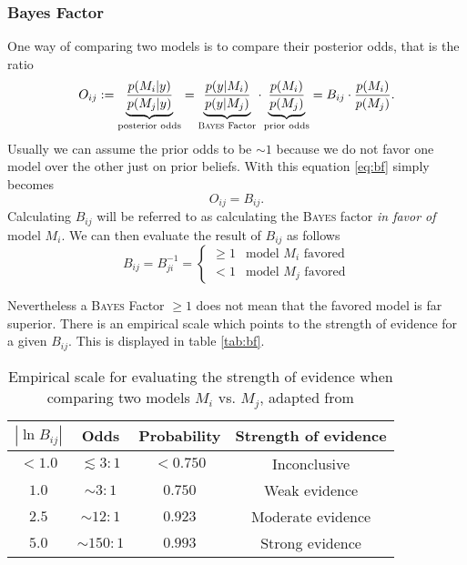 \documentclass[%
 reprint,
 amsmath,amssymb,
 aps,
]{revtex4-1}
\begin{document}
\subsubsection{\textbf{Bayes Factor}}
One way of comparing two models is to compare their posterior odds, that is the ratio \cite{Trotta_2008} \begin{equation}\label{eq:bf}O_{ij}:=\underbrace{\frac{p(M_i|y)}{p(M_j|y)}}_{\text{posterior odds}}=\underbrace{\frac{p(y|M_i)}{p(y|M_j)}}_{\text{\textsc{Bayes} Factor}}\cdot\underbrace{\frac{p(M_i)}{p(M_j)}}_{\text{prior odds}}=B_{ij}\cdot\frac{p(M_i)}{p(M_j)}.\end{equation}
Usually we can assume the prior odds to be $\sim 1$ because we do not favor one model over the other just on prior beliefs. With this equation \eqref{eq:bf} simply becomes $$O_{ij}=B_{ij}.$$
Calculating $B_{ij}$ will be referred to as calculating the \textsc{Bayes} factor \emph{in favor of} model $M_i$. We can then evaluate the result of $B_{ij}$ as follows 
\begin{equation*}
	B_{ij}=B_{ji}^{-1}=\begin{cases} \geq 1 & \text{model } M_i \text{ favored}\\
	 <1 & \text{model } M_j \text{ favored}
	\end{cases}
\end{equation*}

Nevertheless a \textsc{Bayes} Factor $\geq1$ does not mean that the favored model is far superior. There is an empirical scale which points to the strength of evidence for a given $B_{ij}$. This is displayed in table \eqref{tab:bf}.


\begin{table}[htbp]

	\centering
	{\renewcommand{\arraystretch}{1.3}
	\begin{tabular}{|c|c|c|c|}
		\hline
		$|\ln B_{ij}|$& Odds & Probability & Strength of evidence \\
		\hline
		$< 1.0$& $ \lesssim 3:1$ & $< 0.750$  & Inconclusive  \\
		$1.0$ & $\sim 3:1$ & $0.750$ & Weak evidence  \\
		$2.5$& $\sim 12:1$ & $0.923$ & Moderate evidence \\
		$5.0$& $\sim 150:1$ & $0.993$ & Strong evidence \\
		\hline
	\end{tabular}}
\caption{Empirical scale for evaluating the strength of evidence when comparing two models $M_i$ vs. $M_j$, adapted from \cite{Trotta_2008}}
\label{tab:bf}
\end{table}
\end{document}
